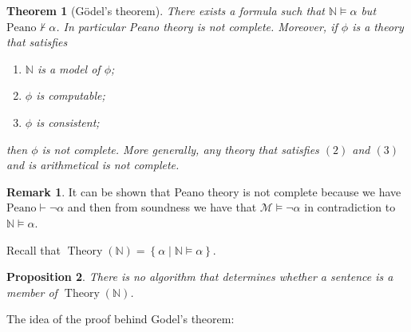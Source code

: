 \documentclass[11pt,a4paper]{article}
\theoremstyle{definition}
\newtheorem{remark}{Remark}[section]
\theoremstyle{plain}
\newtheorem{theorem}{Theorem}[section]
\newtheorem{proposition}[theorem]{Proposition}
\DeclareMathOperator{\Theory}{Theory}
\newcommand{\N}{\mathbb{N}}
\newcommand{\M}{\mathcal{M}}
\newcommand{\set}[2]{ \left\{ #1 \mid #2 \right\} }
\begin{document}
  \begin{theorem}[Gödel's theorem]
    There exists a formula such that $\N \models \alpha$ but 
    $\mathrm{Peano} \nvdash \alpha$.
    In particular Peano theory is not complete.
    Moreover, if $\phi$ is a theory that satisfies
    \begin{enumerate}
      \item[(1)] $\N$ is a model of $\phi$;
      \item[(2)] $\phi$ is computable;
      \item[(3)] $\phi$ is consistent;
    \end{enumerate}
    then $\phi$ is not complete.
    More generally, any theory that satisfies $(2)$ and $(3)$ and is
    arithmetical is not complete.
  \end{theorem}
  \begin{remark}
    It can be shown that Peano theory is not complete because
    we have $\mathrm{Peano} \vdash \neg \alpha$ and then from
    soundness we have that $\M \models \neg \alpha$ in contradiction
    to $\N \models \alpha$.
  \end{remark}

  Recall that $\Theory(\N) = \set{\alpha}{\N \models \alpha}$.
  \begin{proposition}
    There is no algorithm that determines whether a sentence is a member
    of $\Theory(\N)$.
  \end{proposition}

  The idea of the proof behind Godel's theorem:



  
\end{document}
